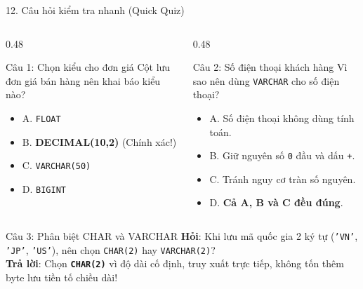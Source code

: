 \documentclass[aspectratio=169,11pt]{beamer}
\newcommand{\kw}[1]{\textcolor{dbblue}{\textbf{#1}}}
\newcommand{\smallgap}{\vspace{0.25em}}
\begin{document}
\begin{frame}{12. Câu hỏi kiểm tra nhanh (Quick Quiz)}
\begin{columns}[t]
  \begin{column}{0.48\textwidth}
    \begin{block}{Câu 1: Chọn kiểu cho đơn giá}
      Cột lưu đơn giá bán hàng nên khai báo kiểu nào?
      \begin{itemize}
        \item A. \texttt{FLOAT}
        \item B. \textbf{\kw{DECIMAL(10,2)}} (Chính xác!)
        \item C. \texttt{VARCHAR(50)}
        \item D. \texttt{BIGINT}
      \end{itemize}
    \end{block}
  \end{column}
  \begin{column}{0.48\textwidth}
    \begin{block}{Câu 2: Số điện thoại khách hàng}
      Vì sao nên dùng \texttt{VARCHAR} cho số điện thoại?
      \begin{itemize}
        \item A. Số điện thoại không dùng tính toán.
        \item B. Giữ nguyên số \texttt{0} đầu và dấu \texttt{+}.
        \item C. Tránh nguy cơ tràn số nguyên.
        \item D. \textbf{\kw{Cả A, B và C đều đúng}}.
      \end{itemize}
    \end{block}
  \end{column}
\end{columns}
\smallgap
\begin{exampleblock}{Câu 3: Phân biệt CHAR và VARCHAR}
  \textbf{Hỏi}: Khi lưu mã quốc gia 2 ký tự (\texttt{'VN'}, \texttt{'JP'}, \texttt{'US'}), nên chọn \texttt{CHAR(2)} hay \texttt{VARCHAR(2)}?\\
  \textbf{Trả lời}: Chọn \kw{\texttt{CHAR(2)}} vì độ dài cố định, truy xuất trực tiếp, không tốn thêm byte lưu tiền tố chiều dài!
\end{exampleblock}
\end{frame}
\end{document}

